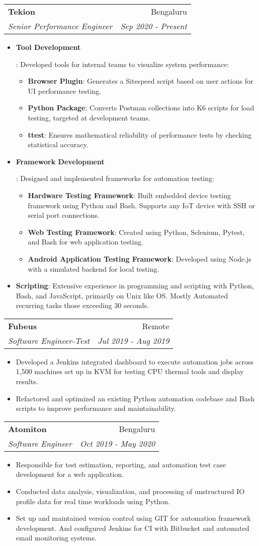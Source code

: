 \documentclass[letterpaper,11pt]{article}
\makeatletter
\newcommand{\resumeItem}[2]{
  \item\small{
    \textbf{#1}{: #2 \vspace{-2pt}}
  }
}
\newcommand{\resumeSubheading}[4]{
  \vspace{-1pt}\item
    \begin{tabular*}{0.97\textwidth}{l@{\extracolsep{\fill}}r}
      \textbf{#1} & #2 \\
      \textit{\small#3} & \textit{\small #4} \\
    \end{tabular*}\vspace{-5pt}
}
\newcommand{\resumeItemListStart}{\begin{itemize}}
\newcommand{\resumeItemListEnd}{\end{itemize}\vspace{-5pt}}
\makeatother
\begin{document}
\resumeSubheading
    {Tekion}{Bengaluru}
    {Senior Performance Engineer}{Sep 2020 - Present}
    \resumeItemListStart
      \resumeItem{Tool Development}
        {Developed tools for internal teams to visualize system performance:
        \begin{itemize}
          \item \textbf{Browser Plugin}: Generates a Sitespeed script based on user actions for UI performance testing.
          \item \textbf{Python Package}: Converts Postman collections into K6 scripts for load testing, targeted at development teams.
          \item \textbf{ttest}: Ensures mathematical reliability of performance tests by checking statistical accuracy.

        \end{itemize}}
      \resumeItem{Framework Development}
        {Designed and implemented frameworks for automation testing:
        \begin{itemize}
          \item \textbf{Hardware Testing Framework}: Built embedded device testing framework using Python and Bash. Supports any IoT device with SSH or serial port connections.
          \item \textbf{Web Testing Framework}: Created using Python, Selenium, Pytest, and Bash for web application testing.
          \item \textbf{Android Application Testing Framework}: Developed using Node.js with a simulated backend for local testing.
        \end{itemize}}
      \resumeItem{Scripting}
        {Extensive experience in programming and scripting with Python, Bash, and JavaScript, primarily on Unix like OS. Mostly Automated recurring tasks those exceeding 30 seconds.}
    \resumeItemListEnd

      \resumeSubheading
      {Fubeus}{Remote}
      {Software Engineer-Test}{Jul 2019 - Aug 2019}
      \resumeItemListStart
             \item
             {Developed a Jenkins integrated dashboard to execute automation jobs across 1,500 machines set up in KVM for testing CPU thermal tools and display results.}
            \item
            {Refactored and optimized an existing Python automation codebase and Bash scripts to improve performance and maintainability.}
      \resumeItemListEnd

    \resumeSubheading
      {Atomiton}{Bengaluru}
      {Software Engineer}{Oct 2019 - May 2020}
      \resumeItemListStart
             \item
              {Responsible for test estimation, reporting, and automation test case development for a web application.}
             \item
              {Conducted data analysis, visualization, and processing of unstructured IO profile data for real time workloads using Python.}
             \item
              {Set up and maintained version control using GIT for automation framework development. And configured Jenkins for CI with Bitbucket and automated email monitoring systems.}
      \resumeItemListEnd
\end{document}
